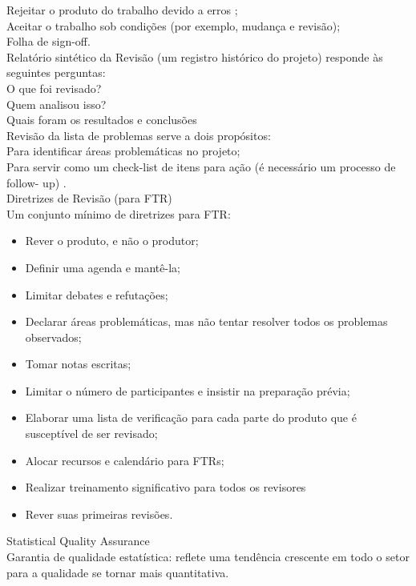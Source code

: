 \documentclass[12pt]{article}
\begin{document}
        Rejeitar o produto do trabalho devido a erros ;\\
        Aceitar o trabalho sob condições (por exemplo, mudança e revisão);\\
        Folha de sign-off.\\
        Relatório sintético da Revisão (um registro histórico do projeto) responde às seguintes perguntas: \\
        O que foi revisado? \\
        Quem analisou isso? \\
        Quais foram os resultados e conclusões \\
        Revisão da lista de problemas serve a dois propósitos: \\
        Para identificar áreas problemáticas no projeto;\\
        Para servir como um check-list de itens para ação (é necessário um processo de follow- up) .\\
        Diretrizes de Revisão (para FTR) \\
        Um conjunto mínimo de diretrizes para FTR: \\
        \begin{itemize}
            \item Rever o produto, e não o produtor; 
            \item Definir uma agenda e mantê-la; 
            \item Limitar debates e refutações; 
            \item Declarar áreas problemáticas, mas não tentar resolver todos os problemas observados; 
            \item Tomar notas escritas; 
            \item Limitar o número de participantes e insistir na preparação prévia; 
            \item Elaborar uma lista de verificação para cada parte do produto que é susceptível de ser revisado; 
            \item Alocar recursos e calendário para FTRs; 
            \item Realizar treinamento significativo para todos os revisores
            \item Rever suas primeiras revisões. 
        \end{itemize}
        Statistical Quality Assurance \\
        Garantia de qualidade estatística: reflete uma tendência crescente em todo o setor para a qualidade se tornar mais quantitativa. \\
\end{document}
